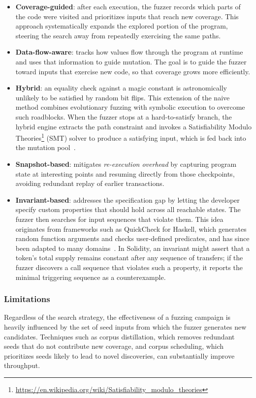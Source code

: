 \begin{itemize}
    \item \textbf{Coverage-guided}: after each execution, the fuzzer records which parts of the code were visited and prioritizes inputs that reach new coverage. This approach systematically expands the explored portion of the program, steering the search away from repeatedly exercising the same paths.
    \item \textbf{Data-flow-aware}: tracks how values flow through the program at runtime and uses that information to guide mutation. The goal is to guide the fuzzer toward inputs that exercise new code, so that coverage grows more efficiently.
    \item \textbf{Hybrid}: an equality check against a magic constant is astronomically unlikely to be satisfied by random bit flips. This extension of the naive method combines evolutionary fuzzing with symbolic execution to overcome such roadblocks. When the fuzzer stops at a hard-to-satisfy branch, the hybrid engine extracts the path constraint and invokes a Satisfiability Modulo Theories\footnote{\url{https://en.wikipedia.org/wiki/Satisfiability_modulo_theories}} (SMT) solver to produce a satisfying input, which is fed back into the mutation pool~\cite{torres2021confuzzius}.
    \item \textbf{Snapshot-based}: mitigates \emph{re-execution overhead} by capturing program state at interesting points and resuming directly from those checkpoints, avoiding redundant replay of earlier transactions.
    \item \textbf{Invariant-based}: addresses the specification gap by letting the developer specify custom properties that should hold across all reachable states. The fuzzer then searches for input sequences that violate them. This idea originates from frameworks such as QuickCheck for Haskell, which generates random function arguments and checks user-defined predicates, and has since been adapted to many domains~\cite{claessen2000quickcheck}. In Solidity, an invariant might assert that a token's total supply remains constant after any sequence of transfers; if the fuzzer discovers a call sequence that violates such a property, it reports the minimal triggering sequence as a counterexample.
\end{itemize}

\subsubsection*{Limitations}
Regardless of the search strategy, the effectiveness of a fuzzing campaign is heavily influenced by the set of seed inputs from which the fuzzer generates new candidates. Techniques such as corpus distillation, which removes redundant seeds that do not contribute new coverage, and corpus scheduling, which prioritizes seeds likely to lead to novel discoveries, can substantially improve throughput.

